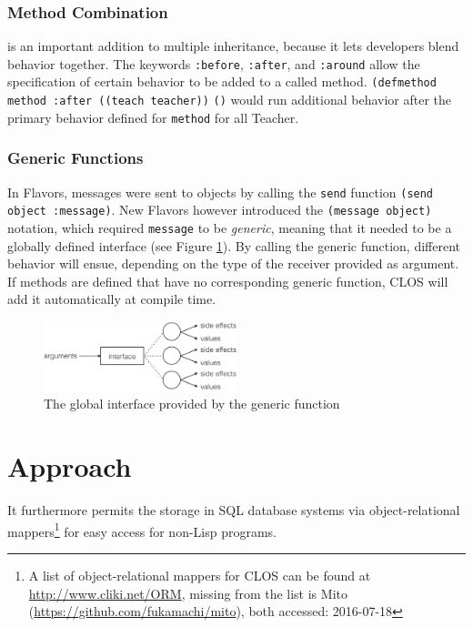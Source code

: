 \documentclass[oribibl]{llncs}
\begin{document}
\subsubsection{Method Combination}
\label{sec:metcom}
is an important addition to multiple inheritance, because it lets developers blend behavior together. The keywords \texttt{:before}, \texttt{:after}, and \texttt{:around} allow the specification of certain behavior to be added to a called method. \texttt{(defmethod method :after}\texttt{ ((teach teacher))}
    \texttt{()} would run additional behavior after the primary behavior defined for \texttt{method} for all Teacher. 


\subsubsection{Generic Functions}
\label{sec:genfun}
In Flavors, messages were sent to objects by calling the \texttt{send} function \texttt{(send object :message)}. New Flavors however introduced the \texttt{(message object)} notation, which required \texttt{message} to be \emph{generic}, meaning that it needed to be a globally defined interface (see Figure \ref{fig:genericfunction}). By calling the generic function, different behavior will ensue, depending on the type of the receiver provided as argument. If methods are defined that have no corresponding generic function, CLOS will add it automatically at compile time.


\begin{figure}[ht]
    \centering
    \includegraphics[width=0.5\textwidth]{images/genericfunction.png}
    \caption{The global interface provided by the generic function}
    \label{fig:genericfunction}
\end{figure}

\section{Approach}
\label{sec:approach}

It furthermore permits the storage in SQL database systems via object-relational mappers\footnote{A list of object-relational mappers for CLOS can be found at \url{http://www.cliki.net/ORM},  missing from the list is Mito (\url{https://github.com/fukamachi/mito}), both accessed: 2016-07-18} for easy access for non-Lisp programs.
\end{document}
